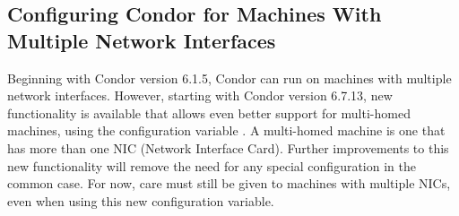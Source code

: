 \subsection{\label{sec:Multiple-Interfaces}Configuring Condor for
Machines With Multiple Network Interfaces } 


%
%
%
%


Beginning with Condor version 6.1.5, Condor can run on machines with
multiple network interfaces.
However, starting with Condor version 6.7.13, new functionality is
available that allows even better support for multi-homed
machines, using the configuration variable .
A multi-homed machine is one that has more than one
NIC (Network Interface Card).
Further improvements to this new functionality will remove the need
for any special configuration in the common case.
For now, care
must still be given to machines with multiple NICs, even
when using this new configuration variable.


